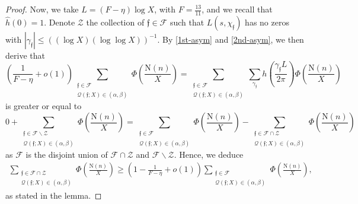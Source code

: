 \documentclass[11pt]{amsart}
\newcommand{\norm}{\mathrm{N}}
\numberwithin{equation}{section}
\theoremstyle{remark}
\begin{document}
\begin{proof}
Now, we take $L = (F-\eta) \log X$, with $F=\frac{13}{11}$, and we recall that $\hat{h}(0)=1$.  Denote $\mathcal{Z}$ the collection of $\mathfrak{f} \in\mathcal{F}$ such that  $L(s,\chi_\mathfrak{f})$ has no zeros with  $|\gamma_{\mathfrak{f} }| \le ((\log X) (\log \log X))^{-1}$. By \eqref{1st-asym} and \eqref{2nd-asym}, we then derive that
$$
 \left(\frac{1}{F-\eta } +o(1)\right) 
 \sum_{\substack{ \mathfrak{f} \in\mathcal{F}\\ \mathcal{Q}(\mathfrak{f};X) \in (\alpha,\beta) }}  \Phi\left(\frac{\norm(n)}{X}\right)
   =\sum_{\substack{ \mathfrak{f} \in\mathcal{F}\\ \mathcal{Q}(\mathfrak{f};X) \in (\alpha,\beta) }}     \sum_{\gamma_{\mathfrak{f} }} h\left( \frac{\gamma_{\mathfrak{f} } L}{2\pi}\right)  \Phi\left(\frac{\norm(n)}{X}\right)
$$
is greater or equal to
$$   
 0+ 
\sum_{\substack{ \mathfrak{f} \in\mathcal{F}  \backslash\mathcal{Z}\\ \mathcal{Q}(\mathfrak{f};X) \in (\alpha,\beta) }}  \Phi\left(\frac{\norm(n)}{X}\right) 
=\sum_{\substack{ \mathfrak{f} \in\mathcal{F} \\ \mathcal{Q}(\mathfrak{f};X) \in (\alpha,\beta) }}  \Phi\left(\frac{\norm(n)}{X}\right) 
-\sum_{\substack{ \mathfrak{f} \in\mathcal{F}\cap  \mathcal{Z}   \\ \mathcal{Q}(\mathfrak{f};X) \in (\alpha,\beta) }}  \Phi\left(\frac{\norm(n)}{X}\right) 
$$
as $\mathcal{F}$ is the disjoint union of $\mathcal{F}\cap  \mathcal{Z}$ and  $\mathcal{F}\backslash  \mathcal{Z} $. Hence, we deduce
\begin{align*}
 \sum_{\substack{ \mathfrak{f} \in\mathcal{F}\cap  \mathcal{Z}   \\ \mathcal{Q}(\mathfrak{f};X) \in (\alpha,\beta) }}  \Phi\left(\frac{\norm(n)}{X}\right) 
\ge  
\left(1 - \frac{1}{F-\eta } +o(1)\right)  \sum_{\substack{ \mathfrak{f} \in\mathcal{F} \\ \mathcal{Q}(\mathfrak{f};X) \in (\alpha,\beta) }}  \Phi\left(\frac{\norm(n)}{X}\right),
\end{align*}
as stated in the lemma.
\end{proof}
\end{document}
